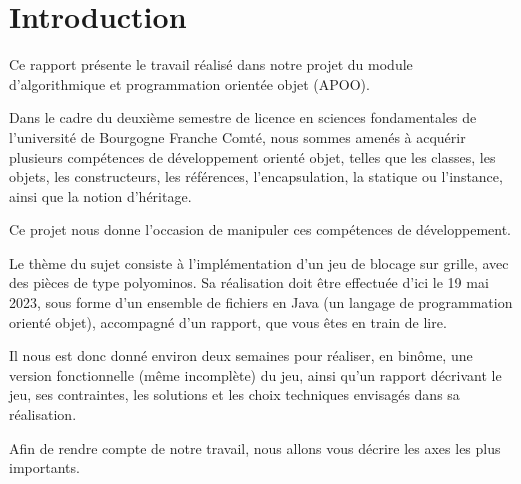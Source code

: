 \chapter*{Introduction}

Ce rapport présente le travail réalisé dans notre projet du module d'algorithmique et programmation orientée objet (APOO).

Dans le cadre du deuxième semestre de licence en sciences fondamentales de l'université de Bourgogne Franche Comté, nous sommes amenés à acquérir plusieurs compétences de développement orienté objet, telles que les classes, les objets, les constructeurs, les références, l'encapsulation, la statique ou l'instance, ainsi que la notion d'héritage.

Ce projet nous donne l'occasion de manipuler ces compétences de développement.

Le thème du sujet consiste à l'implémentation d'un jeu de blocage sur grille, avec des pièces de type polyominos. Sa réalisation doit être effectuée d'ici le 19 mai 2023, sous forme d'un ensemble de fichiers en Java (un langage de programmation orienté objet), accompagné d'un rapport, que vous êtes en train de lire.

Il nous est donc donné environ deux semaines pour réaliser, en binôme, une version fonctionnelle (même incomplète) du jeu, ainsi qu'un rapport décrivant le jeu, ses contraintes, les solutions et les choix techniques envisagés dans sa réalisation.

Afin de rendre compte de notre travail, nous allons vous décrire les axes les plus importants.
